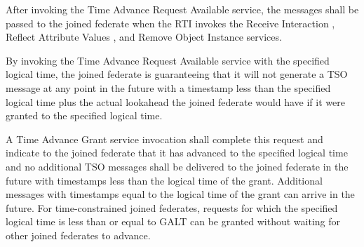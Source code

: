 \begin{compactstdpage}
    After invoking the Time Advance Request Available service, the messages shall be passed to the joined federate when the RTI invokes the Receive Interaction \rtiinitiated{}, Reflect Attribute Values \rtiinitiated{}, and Remove Object Instance \rtiinitiated{} services.

    By invoking the Time Advance Request Available service with the specified logical time, the joined federate is guaranteeing that it will not generate a TSO message at any point in the future with a timestamp less than the specified logical time plus the actual lookahead the joined federate would have if it were granted to the specified logical time.

    A Time Advance Grant \rtiinitiated{} service invocation shall complete this request and indicate to the joined federate that it has advanced to the specified logical time and no additional TSO messages shall be delivered to the joined federate in the future with timestamps less than the logical time of the grant. Additional messages with timestamps equal to the logical time of the grant can arrive in the future. For time-constrained joined federates, requests for which the specified logical time is less than or equal to GALT can be granted without waiting for other joined federates to advance.


\end{compactstdpage}

\clearpage

